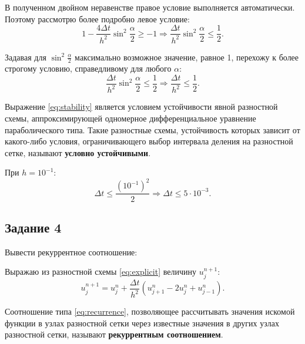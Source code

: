 \documentclass[12pt, a4paper]{report}
\begin{document}
	\par
	В полученном двойном неравенстве правое условие выполняется автоматически. Поэтому рассмотрю более подробно левое условие:
	\begin{equation*}
		1 - \frac{4 \Delta t}{h^{2}}\sin^{2}{\frac{\alpha}{2}} \geq -1 \Rightarrow \frac{\Delta t}{h^{2}}\sin^{2}{\frac{\alpha}{2}} \leq \frac{1}{2}.
	\end{equation*}
	\par
	Задавая для $\sin^{2}{\frac{\alpha}{2}}$ максимально возможное значение, равное 1, перехожу к более строгому условию, справедливому для любого $\alpha$:
	\begin{equation}\label{eq:stability}
		\frac{\Delta t}{h^{2}}\sin^{2}{\frac{\alpha}{2}} \leq \frac{1}{2} \Rightarrow \frac{\Delta t}{h^{2}} \leq \frac{1}{2}.
	\end{equation}
	\par
	Выражение \eqref{eq:stability} является условием устойчивости явной разностной схемы, аппроксимирующей одномерное дифференциальное уравнение параболического типа. Такие разностные схемы, устойчивость которых зависит от какого-либо условия, ограничивающего выбор интервала деления на разностной сетке, называют \textbf{условно устойчивыми}. \par
	При $h = 10^{-1}$:
	\begin{equation*}
		\Delta t \leq \frac{(10^{-1})^{2}}{2} \Rightarrow \Delta t \leq 5 \cdot 10^{-3}.
	\end{equation*}

	\subsection*{Задание 4}
	\large
	Вывести рекуррентное соотношение: \par
	Выражаю из разностной схемы \eqref{eq:explicit} величину $u_{j}^{n+1}$:
	\begin{equation}\label{eq:recurrence}
		u_{j}^{n+1} = u_{j}^{n} + \frac{\Delta t}{h^{2}}(u_{j+1}^{n} - 2u_{j}^{n} + u_{j-1}^{n}).
	\end{equation}
	\par
	Соотношение типа \eqref{eq:recurrence}, позволяющее рассчитывать значения искомой функции в узлах разностной сетки через известные значения в других узлах разностной сетки, называют \textbf{рекуррентным соотношением}.
\end{document}
